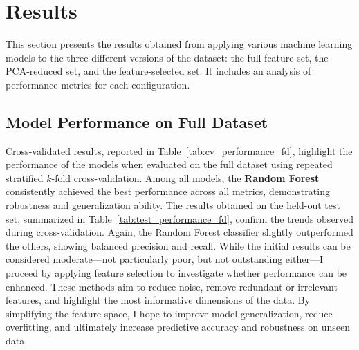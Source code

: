 \section{Results}

This section presents the results obtained from applying various machine learning models to the three different versions of the dataset: the full feature set, the PCA-reduced set, and the feature-selected set. It includes an analysis of performance metrics for each configuration.

\subsection{Model Performance on Full Dataset}

Cross-validated results, reported in Table~\ref{tab:cv_performance_fd}, highlight the performance of the models when evaluated on the full dataset using repeated stratified $k$-fold cross-validation. Among all models, the \textbf{Random Forest} consistently achieved the best performance across all metrics, demonstrating robustness and generalization ability.
\noindent
The results obtained on the held-out test set, summarized in Table~\ref{tab:test_performance_fd}, confirm the trends observed during cross-validation. Again, the Random Forest classifier slightly outperformed the others, showing balanced precision and recall.
\noindent
While the initial results can be considered moderate—not particularly poor, but not outstanding either—I proceed by applying feature selection to investigate whether performance can be enhanced. These methods aim to reduce noise, remove redundant or irrelevant features, and highlight the most informative dimensions of the data. By simplifying the feature space, I hope to improve model generalization, reduce overfitting, and ultimately increase predictive accuracy and robustness on unseen data.



